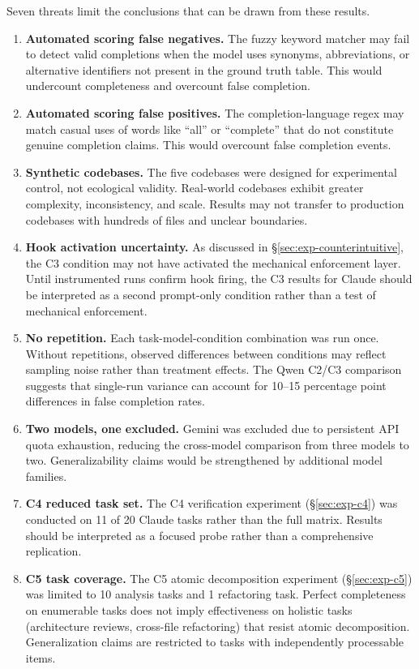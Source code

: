 Seven threats limit the conclusions that can be drawn from these results.

\begin{enumerate}[nosep]
  \item \textbf{Automated scoring false negatives.} The fuzzy keyword matcher may fail to detect valid completions when the model uses synonyms, abbreviations, or alternative identifiers not present in the ground truth table. This would undercount completeness and overcount false completion.
  \item \textbf{Automated scoring false positives.} The completion-language regex may match casual uses of words like ``all'' or ``complete'' that do not constitute genuine completion claims. This would overcount false completion events.
  \item \textbf{Synthetic codebases.} The five codebases were designed for experimental control, not ecological validity. Real-world codebases exhibit greater complexity, inconsistency, and scale. Results may not transfer to production codebases with hundreds of files and unclear boundaries.
  \item \textbf{Hook activation uncertainty.} As discussed in \S\ref{sec:exp-counterintuitive}, the C3 condition may not have activated the mechanical enforcement layer. Until instrumented runs confirm hook firing, the C3 results for Claude should be interpreted as a second prompt-only condition rather than a test of mechanical enforcement.
  \item \textbf{No repetition.} Each task-model-condition combination was run once. Without repetitions, observed differences between conditions may reflect sampling noise rather than treatment effects. The Qwen C2/C3 comparison suggests that single-run variance can account for 10--15 percentage point differences in false completion rates.
  \item \textbf{Two models, one excluded.} Gemini was excluded due to persistent API quota exhaustion, reducing the cross-model comparison from three models to two. Generalizability claims would be strengthened by additional model families.
  \item \textbf{C4 reduced task set.} The C4 verification experiment (\S\ref{sec:exp-c4}) was conducted on 11 of 20 Claude tasks rather than the full matrix. Results should be interpreted as a focused probe rather than a comprehensive replication.
  \item \textbf{C5 task coverage.} The C5 atomic decomposition experiment (\S\ref{sec:exp-c5}) was limited to 10 analysis tasks and 1 refactoring task. Perfect completeness on enumerable tasks does not imply effectiveness on holistic tasks (architecture reviews, cross-file refactoring) that resist atomic decomposition. Generalization claims are restricted to tasks with independently processable items.
\end{enumerate}


